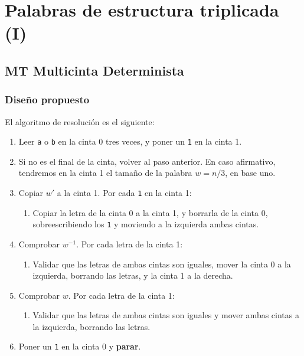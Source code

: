 \section{Palabras de estructura triplicada (I)}


\subsection{MT Multicinta Determinista}

\subsubsection*{Diseño propuesto}
El algoritmo de resolución es el siguiente:

\begin{enumerate}
    \item Leer \texttt{a} o \texttt{b} en la cinta 0 tres veces, y poner un \texttt{1} en la cinta 1.
    \item Si no es el final de la cinta, volver al paso anterior. En caso afirmativo, tendremos en la cinta 1 el tamaño de la palabra $w = n/3$, en base uno.
    \item Copiar $w'$ a la cinta 1. Por cada \texttt{1} en la cinta 1:
    \begin{enumerate}[1.]
        \item Copiar la letra de la cinta 0 a la cinta 1, y borrarla de la cinta 0, sobreescribiendo los \texttt{1} y moviendo a la izquierda ambas cintas.
    \end{enumerate}
    \item Comprobar $w^{-1}$. Por cada letra de la cinta 1:
    \begin{enumerate}[1.]
        \item Validar que las letras de ambas cintas son iguales, mover la cinta 0 a la izquierda, borrando las letras, y la cinta 1 a la derecha.
    \end{enumerate}
    \item Comprobar $w$. Por cada letra de la cinta 1:
    \begin{enumerate}[1.]
        \item Validar que las letras de ambas cintas son iguales y mover ambas cintas a la izquierda, borrando las letras.
    \end{enumerate}
    \item Poner un \texttt{1} en la cinta 0 y \textbf{parar}.
\end{enumerate}

